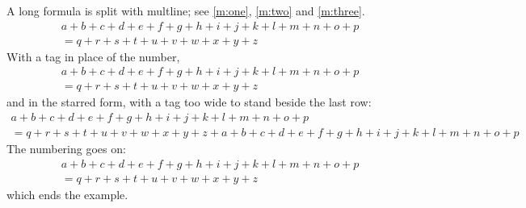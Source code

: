 \documentclass{article}
\begin{document}
A long formula is split with multline; see \eqref{m:one}, \eqref{m:two} and \ref{m:three}.
\begin{multline} \label{m:one}
a + b + c + d + e + f + g + h + i + j + k + l + m + n + o + p \\
= q + r + s + t + u + v + w + x + y + z
\end{multline}
With a tag in place of the number,
\begin{multline}
a + b + c + d + e + f + g + h + i + j + k + l + m + n + o + p \tag{M} \label{m:two} \\
= q + r + s + t + u + v + w + x + y + z
\end{multline}
and in the starred form, with a tag too wide to stand beside the last row:
\begin{multline*}
a + b + c + d + e + f + g + h + i + j + k + l + m + n + o + p \\
= q + r + s + t + u + v + w + x + y + z + a + b + c + d + e + f + g + h + i + j + k + l + m + n + o + p \tag*{[the long one]} \label{m:three}
\end{multline*}
The numbering goes on:
\begin{multline}
a + b + c + d + e + f + g + h + i + j + k + l + m + n + o + p \\
= q + r + s + t + u + v + w + x + y + z
\end{multline}
which ends the example.
\end{document}
